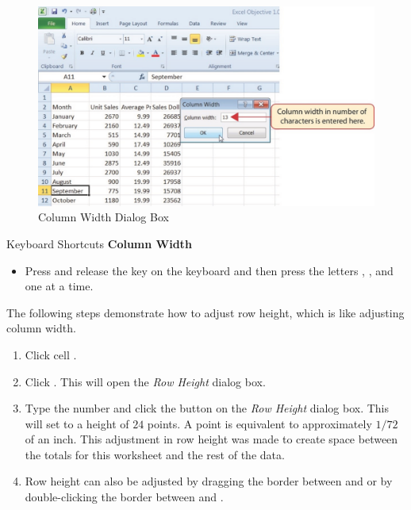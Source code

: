 \begin{figure}[H]
	\centering
	\includegraphics[width=\maxwidth{.95\linewidth}]{gfx/ch01_fig24}
	\caption{Column Width Dialog Box}
	\label{01:fig24}
\end{figure}

\begin{center}
	\begin{shtcutbox}{Keyboard Shortcuts}
		\textbf{Column Width}
		\\
		\begin{itemize}
			\setlength{\itemsep}{0pt}
			\setlength{\parskip}{0pt}
			\setlength{\parsep}{0pt}
			
			\item Press and release the  key on the keyboard and then press the letters , , and  one at a time.
			
		\end{itemize}
	\end{shtcutbox}
\end{center}

The following steps demonstrate how to adjust row height, which is like adjusting column width.

\begin{enumbox}
	\begin{enumerate}
		\item Click cell .
		\item Click . This will open the \textit{Row Height} dialog box.
		\item Type the number  and click the  button on the \textit{Row Height} dialog box. This will set  to a height of $ 24 $ points. A point is equivalent to approximately $ 1/72 $ of an inch. This adjustment in row height was made to create space between the totals for this worksheet and the rest of the data.
		\item Row height can also be adjusted by dragging the border between  and  or by double-clicking the border between  and .
	\end{enumerate}
\end{enumbox}


